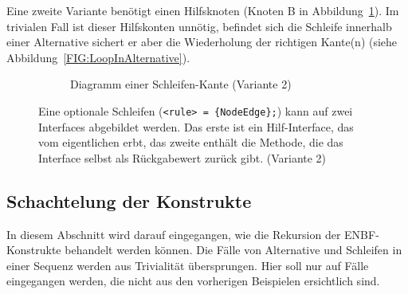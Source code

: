 \documentclass[../InterneDSLs.tex]{subfiles}
\begin{document}
Eine zweite Variante benötigt einen Hilfsknoten (Knoten B in Abbildung~\ref{FIG:DiagramLoopNodeAlt}). Im trivialen Fall ist dieser Hilfskonten unnötig, befindet sich die Schleife innerhalb einer Alternative sichert er aber die Wiederholung der richtigen Kante(n) (siehe Abbildung~\ref{FIG:LoopInAlternative}).
\begin{figure}[ht]
\centering
  \begin{subfigure}[c]{0.49\textwidth}
    \caption{Diagramm einer Schleifen-Kante (Variante 2)}
    \label{FIG:DiagramLoopNodeAlt}
  \end{subfigure}
  \begin{subfigure}[c]{0.49\textwidth}
    
  \end{subfigure}
  \caption[Abbildung einer optionalen Schleife (Variante 2)]{Eine optionale Schleifen (\texttt{<rule> = \{NodeEdge\};}) kann auf zwei Interfaces abgebildet werden. Das erste ist ein Hilf-Interface, das vom eigentlichen erbt, das zweite enthält die Methode, die das Interface selbst als Rückgabewert zurück gibt. (Variante 2)}
  \label{FIG:LoopNodeAlt}
\end{figure}


\subsection{Schachtelung der Konstrukte}
In diesem Abschnitt wird darauf eingegangen, wie die Rekursion der ENBF-Konstrukte behandelt werden können. Die Fälle von Alternative und Schleifen in einer Sequenz werden aus Trivialität übersprungen. Hier soll nur auf Fälle eingegangen werden, die nicht aus den vorherigen Beispielen ersichtlich sind.
\end{document}

